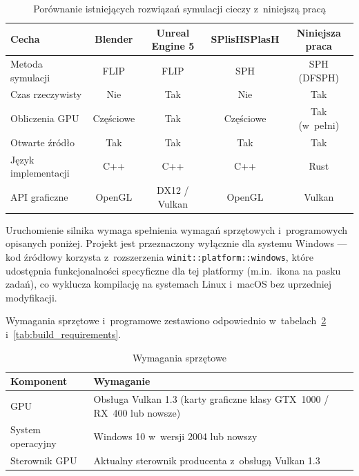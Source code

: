 \begin{table}[ht]
    \centering
    \caption{Porównanie istniejących rozwiązań symulacji cieczy z~niniejszą pracą}
    \label{tab:solutions_comparison}
    \small
    \begin{tabular}{lcccc}
    \toprule
    Cecha & Blender & Unreal Engine 5 & SPlisHSPlasH & Niniejsza praca \\ \midrule
    Metoda symulacji       & FLIP      & FLIP          & SPH       & SPH (DFSPH) \\
    Czas rzeczywisty       & Nie       & Tak           & Nie       & Tak         \\
    Obliczenia GPU         & Częściowe & Tak           & Częściowe & Tak (w~pełni) \\
    Otwarte źródło         & Tak       & Tak           & Tak       & Tak         \\
    Język implementacji    & C++       & C++           & C++       & Rust        \\
    API graficzne          & OpenGL    & DX12 / Vulkan & OpenGL    & Vulkan      \\
    \bottomrule
    \end{tabular}
\end{table}

Uruchomienie silnika wymaga spełnienia wymagań sprzętowych i~programowych
opisanych poniżej. Projekt jest przeznaczony wyłącznie dla systemu Windows ---
kod źródłowy korzysta z~rozszerzenia \texttt{winit::platform::windows}, które
udostępnia funkcjonalności specyficzne dla tej platformy
(m.in.\ ikona na pasku zadań), co wyklucza kompilację na systemach Linux
i~macOS bez uprzedniej modyfikacji.

Wymagania sprzętowe i~programowe zestawiono odpowiednio
w~tabelach~\ref{tab:hw_requirements} i~\ref{tab:build_requirements}.

\begin{table}[H]
\centering
\caption{Wymagania sprzętowe}
\label{tab:hw_requirements}
\begin{tabular}{lp{8cm}}
\toprule
\textbf{Komponent} & \textbf{Wymaganie} \\
\midrule
GPU & Obsługa Vulkan 1.3 (karty graficzne klasy GTX~1000 / RX~400 lub nowsze) \\[4pt]
System operacyjny & Windows 10 w~wersji 2004 lub nowszy \\[4pt]
Sterownik GPU & Aktualny sterownik producenta z~obsługą Vulkan 1.3 \\
\bottomrule
\end{tabular}
\end{table}

